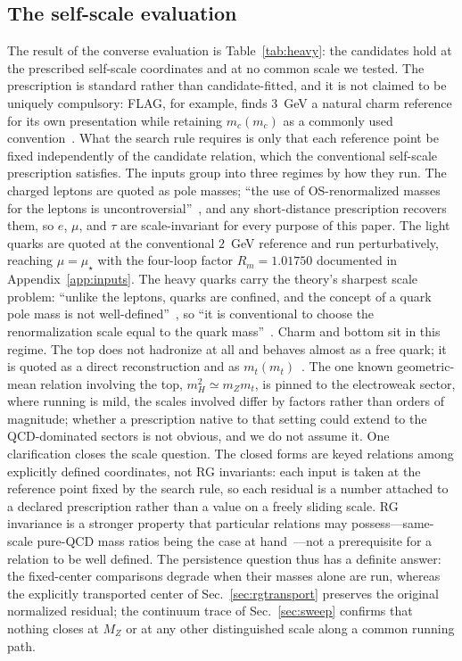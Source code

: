 \documentclass[aps,twocolumn,superscriptaddress,nofootinbib,floatfix]{revtex4-2}
\newcommand{\mstar}{\mu_\star}
\begin{document}
\subsection{The self-scale evaluation}
\label{sec:scalegrouping}

The result of the converse evaluation is Table~\ref{tab:heavy}: the candidates hold at the prescribed self-scale coordinates and at no common scale we tested. The prescription is standard rather than candidate-fitted, and it is not claimed to be uniquely compulsory: FLAG, for example, finds $3$~GeV a natural charm reference for its own presentation while retaining $m_c(m_c)$ as a commonly used convention~\cite{FLAG2024}. What the search rule requires is only that each reference point be fixed independently of the candidate relation, which the conventional self-scale prescription satisfies. The inputs group into three regimes by how they run. The charged leptons are quoted as pole masses; ``the use of OS-renormalized masses for the leptons is uncontroversial''~\cite{PDG2026}, and any short-distance prescription recovers them, so $e$, $\mu$, and $\tau$ are scale-invariant for every purpose of this paper. The light quarks are quoted at the conventional $2$~GeV reference and run perturbatively, reaching $\mu=\mstar$ with the four-loop factor $R_m=1.01750$ documented in Appendix~\ref{app:inputs}. The heavy quarks carry the theory's sharpest scale problem: ``unlike the leptons, quarks are confined, and the concept of a quark pole mass is not well-defined''~\cite{PDG2026}, so ``it is conventional to choose the renormalization scale equal to the quark mass''~\cite{PDG2026}. Charm and bottom sit in this regime. The top does not hadronize at all and behaves almost as a free quark; it is quoted as a direct reconstruction and as $m_t(m_t)$~\cite{PDG2026}. The one known geometric-mean relation involving the top, $m_H^2\simeq m_Zm_t$, is pinned to the electroweak sector, where running is mild, the scales involved differ by factors rather than orders of magnitude; whether a prescription native to that setting could extend to the QCD-dominated sectors is not obvious, and we do not assume it. One clarification closes the scale question. The closed forms are keyed relations among explicitly defined coordinates, not RG invariants: each input is taken at the reference point fixed by the search rule, so each residual is a number attached to a declared prescription rather than a value on a freely sliding scale. RG invariance is a stronger property that particular relations may possess---same-scale pure-QCD mass ratios being the case at hand~\cite{GasserLeutwyler1982,PDG2026}---not a prerequisite for a relation to be well defined. The persistence question thus has a definite answer: the fixed-center comparisons degrade when their masses alone are run, whereas the explicitly transported center of Sec.~\ref{sec:rgtransport} preserves the original normalized residual; the continuum trace of Sec.~\ref{sec:sweep} confirms that nothing closes at $M_Z$ or at any other distinguished scale along a common running path.
\end{document}
